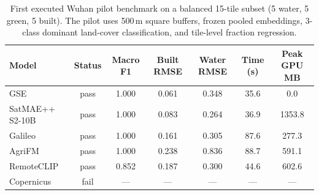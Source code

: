 \begin{table}[t]
\centering
\caption{First executed Wuhan pilot benchmark on a balanced 15-tile subset (5 water, 5 green, 5 built). The pilot uses 500\,m square buffers, frozen pooled embeddings, 3-class dominant land-cover classification, and tile-level fraction regression.}
\label{tab:wuhan-pilot-results}
\small
\begin{tabular}{lcccccc}
\toprule
Model & Status & Macro F1 & Built RMSE & Water RMSE & Time (s) & Peak GPU MB \\
\midrule
GSE & pass & 1.000 & 0.061 & 0.348 & 35.6 & 0.0 \\
SatMAE++ S2-10B & pass & 1.000 & 0.083 & 0.264 & 36.9 & 1353.8 \\
Galileo & pass & 1.000 & 0.161 & 0.305 & 87.6 & 277.3 \\
AgriFM & pass & 1.000 & 0.238 & 0.836 & 88.7 & 591.1 \\
RemoteCLIP & pass & 0.852 & 0.187 & 0.300 & 44.6 & 602.6 \\
Copernicus & fail & --- & --- & --- & --- & --- \\
\bottomrule
\end{tabular}
\end{table}
